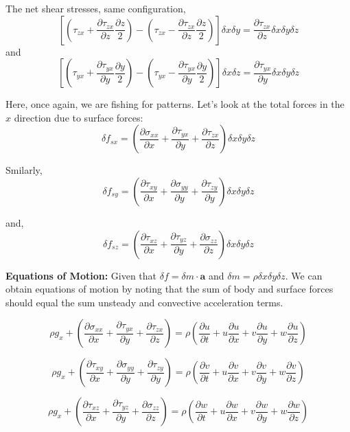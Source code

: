 \documentclass[10pt,a4paper,draft]{article}
\begin{document}
The net shear stresses, same configuration,
$$
\left[
	\left(
	\tau_{zx} 
	+ \frac{\partial \tau_{zx}}{\partial z} \frac{\partial z}{2}
	\right)
	-
	\left(
	\tau_{zx} 
	- \frac{\partial \tau_{zx}}{\partial z} \frac{\partial z}{2}
	\right)
\right] \delta x\delta y
= \frac{\partial \tau_{zx}}{\partial z} \delta x\delta y\delta z
$$ 
and
$$
\left[
	\left(
	\tau_{yx} 
	+ \frac{\partial \tau_{yx}}{\partial y} \frac{\partial y}{2}
	\right)
	-
	\left(
	\tau_{yx} 
	- \frac{\partial \tau_{yx}}{\partial y} \frac{\partial y}{2}
	\right)
\right] \delta x\delta z
= \frac{\partial \tau_{yx}}{\partial y} \delta x\delta y\delta z
$$ 

Here, once again, we are fishing for patterns. Let's look at the total forces in the $x$ direction due to surface forces:
$$
\delta f_{sx} 
= 
\left(
	\frac{\partial \sigma_{xx}}{\partial x} + \frac{\partial \tau_{yx}}{\partial y} + \frac{\partial \tau_{zx}}{\partial z} 
\right) \delta x\delta y\delta z
$$

Smilarly,
$$
\delta f_{sy} 
= 
\left(
	\frac{\partial \tau_{xy}}{\partial x} + \frac{\partial \sigma_{yy}}{\partial y} + \frac{\partial \tau_{zy}}{\partial y} 
\right) \delta x\delta y\delta z
$$

and,
$$
\delta f_{sz} 
= 
\left(
	\frac{\partial \tau_{xz}}{\partial x} + \frac{\partial \tau_{yz}}{\partial y} + \frac{\partial \sigma_{zz}}{\partial z} 
\right) \delta x\delta y\delta z
$$

\textbf{Equations of Motion:}
Given that $\delta f = \delta m \cdot \mathbf{a}$ and $\delta m = \rho \delta x\delta y\delta z$. 
We can obtain equations of motion by noting that the sum of body and surface forces should equal the sum unsteady and convective acceleration terms.
 
$$
\rho g_x 
+ 
\left(
	\frac{\partial \sigma_{xx}}{\partial x} + \frac{\partial \tau_{yx}}{\partial y} + \frac{\partial \tau_{zx}}{\partial z} 
\right)
= \rho 
\left( 
	\frac{\partial u}{\partial t} 
+ u \frac{\partial u}{\partial x}
+ v \frac{\partial u}{\partial y}
+ w \frac{\partial u}{\partial z}
\right)
$$

$$
\rho g_x 
+ 
\left(
	\frac{\partial \tau_{xy}}{\partial x} + \frac{\partial \sigma_{yy}}{\partial y} + \frac{\partial \tau_{zy}}{\partial y} 
\right)
= \rho 
\left( 
	\frac{\partial v}{\partial t} 
+ u \frac{\partial v}{\partial x}
+ v \frac{\partial v}{\partial y}
+ w \frac{\partial v}{\partial z}
\right)
$$

$$
\rho g_x 
+ 
\left(
	\frac{\partial \tau_{xz}}{\partial x} + \frac{\partial \tau_{yz}}{\partial y} + \frac{\partial \sigma_{zz}}{\partial z}
\right)
= \rho 
\left( 
	\frac{\partial w}{\partial t} 
+ u \frac{\partial w}{\partial x}
+ v \frac{\partial w}{\partial y}
+ w \frac{\partial w}{\partial z}
\right)
$$
\end{document}
